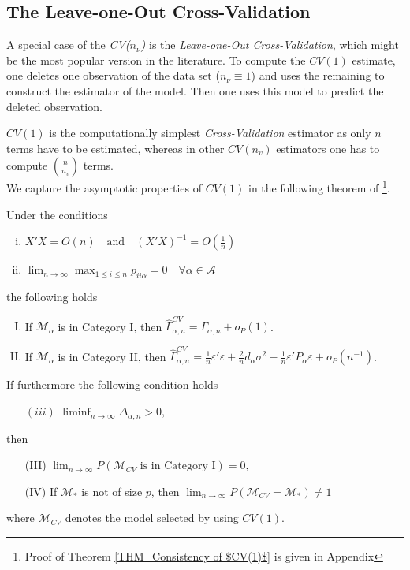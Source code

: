\documentclass[Research_Module_ES.tex]{subfiles}
\begin{document}
\subsection{The Leave-one-Out Cross-Validation}
A special case of the \textit{CV($n_\nu$)} is the \textit{Leave-one-Out Cross-Validation}, which might be the most popular version in the literature.
To compute the $CV(1)$ estimate, one deletes one observation of the data set ($n_\nu\equiv1$) and uses the remaining to construct the estimator of the model. Then one uses this model to predict the
deleted observation.

$CV(1)$ is the computationally simplest \textit{Cross-Validation} estimator as only $n$ terms have to be estimated, whereas in other $CV(n_v)$ estimators one has to compute $\binom{n}{n_v}$ terms.\\

We capture the asymptotic properties of $CV(1)$ in the following theorem of \cite{shao}\footnote{Proof of Theorem \ref{THM_Consistency of $CV(1)$} is given in Appendix }.

\begin{thm}
Under the conditions 
\label{THM_Consistency of $CV(1)$}
\begin{enumerate}[(i)]
\item $X'X = O(n) \quad \textrm{and} \quad (X'X)^{-1}=O(\frac{1}{n})$
\item $ \lim_{n \to \infty} \max_{1\le i\le n} p_{ii\alpha} =0 \quad \forall \alpha \in \mathcal{A} $ 
\end{enumerate}
the following holds
\begin{enumerate}[(I)]
\item If $\mathcal{M}_\alpha$ is in Category I, then $\hat{\Gamma}_{\alpha,n}^{CV} = \Gamma_{\alpha,n} + o_P(1)$.
\item If $\mathcal{M}_\alpha$ is in Category II, then $\hat{\Gamma}_{\alpha,n}^{CV} = \frac{1}{n}\varepsilon'\varepsilon + \frac{2}{n}d_\alpha\sigma^2 - \frac{1}{n}\varepsilon'P_\alpha\varepsilon + o_P(n^{-1})$.
\end{enumerate}
If furthermore the following condition holds
\begin{itemize}
\item[$(iii)$] $\liminf_{n\to \infty} \Delta_{\alpha,n} > 0,$
\end{itemize}
then 
\begin{enumerate}
\item[(III)] $\lim_{n\to\infty} P(\mathcal{M}_{CV}\textrm{ is in Category I})=0$,
\item[(IV)]If $\mathcal{M}_\ast$ is not of size $p$, then $\lim_{n\to\infty}P(\mathcal{M}_{CV}=\mathcal{M}_\ast) \neq 1$
\end{enumerate}
where $\mathcal{M}_{CV}$ denotes the model selected by using $CV(1)$.
\end{thm}
\end{document}
